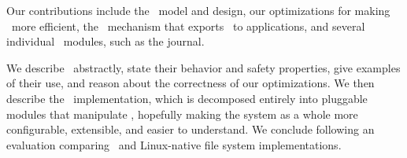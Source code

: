 Our contributions include the \patch\ model and design, our
 optimizations for making \patches\ more efficient,
 the \patchgroup\ mechanism that exports
 \patches\ to applications, and several individual \Kudos\ modules, such as
 the journal.


We describe \patches\ abstractly, state their behavior and safety
 properties, give examples of their use, and reason about the
 correctness of our optimizations.
%
We then describe the \Kudos\ implementation, which is decomposed
 entirely into pluggable modules that manipulate
 \patches, hopefully making the system as a whole more configurable,
 extensible, and easier to understand.
%
We conclude following an evaluation comparing \Kudos\ and Linux-native file
 system implementations.




\begin{comment}
%
Our benchmarks show that our optimizations can reduce the number of
 \patches\ \Kudos\ creates by \patchoptcount\ and the amount of undo data
 memory it allocates by \patchoptundo.
%
Our prototype is not yet as fast as we would like, but it is competitive
 with Linux on many of our benchmarks.
\end{comment}